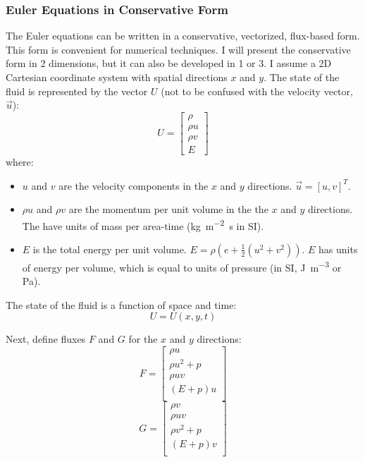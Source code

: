\documentclass[paper=a4, fontsize=11pt]{scrartcl}
\numberwithin{equation}{section}        %
\numberwithin{figure}{section}          %
\numberwithin{table}{section}               %
\begin{document}
\subsubsection{Euler Equations in Conservative Form}
The Euler equations can be written in a conservative, vectorized, flux-based form. This form is convenient for numerical techniques. I will present the conservative form in 2 dimensions, but it can also be developed in 1 or 3. I assume a 2D Cartesian coordinate system with spatial directions $x$ and $y$. The state of the fluid is represented by the vector $U$ (not to be confused with the velocity vector, $\vec{u}$):
\begin{equation}
    U = 
    \begin{bmatrix}
        \rho \\
        \rho u \\
        \rho v \\
        E
    \end{bmatrix}
\end{equation}
where:
\begin{itemize}
    \item $u$ and $v$ are the velocity components in the $x$ and $y$ directions. $\vec{u} = [u, v]^T$.
    \item $\rho u$ and $\rho v$ are the momentum per unit volume in the the $x$ and $y$ directions. The have units of mass per area-time (\si{\kilo\gram\per\meter\squared\second} in SI).
    \item $E$ is the total energy per unit volume. $E = \rho (e + \frac{1}{2}(u^2 + v^2))$. $E$ has units of energy per volume, which is equal to units of pressure (in SI, \si{\joule\per\meter\cubed} or \si{\pascal}).
\end{itemize}

The state of the fluid is a function of space and time:
\begin{equation}
    U = U(x, y, t)
\end{equation}

Next, define fluxes $F$ and $G$ for the $x$ and $y$ directions:
\begin{equation}
    F = 
        \begin{bmatrix}
            \rho u \\
            \rho u^2 + p \\
            \rho u v \\
            (E + p)u \\
        \end{bmatrix}
\end{equation}
\begin{equation}
    G = 
        \begin{bmatrix}
            \rho v \\
            \rho u v \\
            \rho v^2 + p \\
            (E + p)v \\
        \end{bmatrix}
\end{equation}
\end{document}
